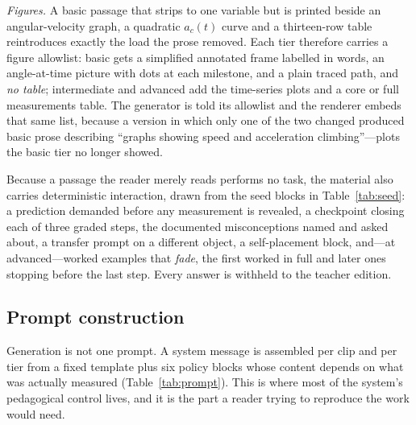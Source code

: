 \documentclass[conference]{IEEEtran}
\newcommand{\ac}{a_{c}}
\begin{document}
\emph{Figures.} A basic passage that strips to one variable but is printed
beside an angular-velocity graph, a quadratic $\ac(t)$ curve and a
thirteen-row table reintroduces exactly the load the prose removed. Each tier
therefore carries a figure allowlist: basic gets a simplified annotated frame
labelled in words, an angle-at-time picture with dots at each milestone, and a
plain traced path, and \emph{no table}; intermediate and advanced add the
time-series plots and a core or full measurements table. The generator is told
its allowlist and the renderer embeds that same list, because a version in
which only one of the two changed produced basic prose describing ``graphs
showing speed and acceleration climbing''---plots the basic tier no longer
showed.

Because a passage the reader merely reads performs no task, the material also
carries deterministic interaction, drawn from the seed blocks in
Table~\ref{tab:seed}: a prediction demanded before any measurement is revealed,
a checkpoint closing each of three graded steps, the documented misconceptions
named and asked about, a transfer prompt on a different object, a
self-placement block, and---at advanced---worked examples that \emph{fade}, the
first worked in full and later ones stopping before the last step. Every answer
is withheld to the teacher edition.

\subsection{Prompt construction}
\label{sec:prompt}

Generation is not one prompt. A system message is assembled per clip and per
tier from a fixed template plus six policy blocks whose content depends on what
was actually measured (Table~\ref{tab:prompt}). This is where most of the
system's pedagogical control lives, and it is the part a reader trying to
reproduce the work would need.
\end{document}
